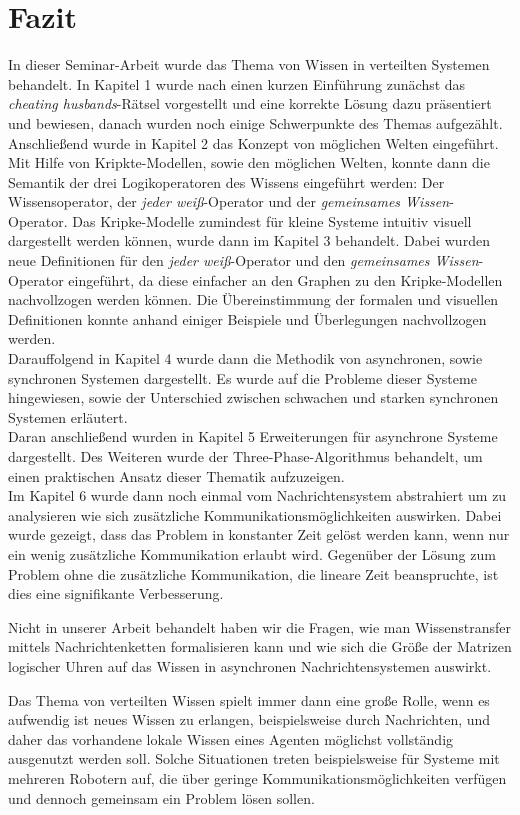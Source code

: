 \section{Fazit}
\label{Zusammenfassung}
In dieser Seminar-Arbeit wurde das Thema von Wissen in verteilten Systemen behandelt.
In Kapitel 1 wurde nach einen kurzen Einführung zunächst das \textit{cheating husbands}-Rätsel vorgestellt und eine korrekte Lösung dazu präsentiert und bewiesen, danach wurden noch einige Schwerpunkte des Themas aufgezählt.
Anschließend wurde in Kapitel 2 das Konzept von möglichen Welten eingeführt. Mit Hilfe von Kripkte-Modellen, sowie den möglichen Welten, konnte dann die Semantik der drei Logikoperatoren des Wissens eingeführt werden: Der Wissensoperator, der \textit{jeder weiß}-Operator und der \textit{gemeinsames Wissen}-Operator.
Das Kripke-Modelle zumindest für kleine Systeme intuitiv visuell dargestellt werden können, wurde dann im Kapitel 3 behandelt. Dabei wurden neue Definitionen für den \textit{jeder weiß}-Operator und den \textit{gemeinsames Wissen}-Operator eingeführt, da diese einfacher an den Graphen zu den Kripke-Modellen nachvollzogen werden können. Die Übereinstimmung der formalen und visuellen Definitionen konnte anhand einiger Beispiele und Überlegungen nachvollzogen werden.\\
Darauffolgend in Kapitel 4 wurde dann die Methodik von asynchronen, sowie synchronen Systemen dargestellt. Es wurde auf die Probleme dieser Systeme hingewiesen, sowie der Unterschied zwischen schwachen und starken synchronen Systemen erläutert.\\
Daran anschließend wurden in Kapitel 5 Erweiterungen für asynchrone Systeme dargestellt. Des Weiteren wurde der Three-Phase-Algorithmus behandelt, um einen praktischen Ansatz dieser Thematik aufzuzeigen. \\
Im Kapitel 6 wurde dann noch einmal vom Nachrichtensystem abstrahiert um zu analysieren wie sich zusätzliche Kommunikationsmöglichkeiten auswirken.
Dabei wurde gezeigt, dass das Problem in konstanter Zeit gelöst werden kann, wenn nur ein wenig zusätzliche Kommunikation erlaubt wird. Gegenüber der Lösung zum Problem ohne die zusätzliche Kommunikation, die lineare Zeit beanspruchte, ist dies eine signifikante Verbesserung.\medskip

Nicht in unserer Arbeit behandelt haben wir die Fragen, wie man Wissenstransfer mittels Nachrichtenketten formalisieren kann und wie sich die Größe der Matrizen logischer Uhren auf das Wissen in asynchronen Nachrichtensystemen auswirkt.\medskip

Das Thema von verteilten Wissen spielt immer dann eine große Rolle, wenn es aufwendig ist neues Wissen zu erlangen, beispielsweise durch Nachrichten, und daher das vorhandene lokale Wissen eines Agenten möglichst vollständig ausgenutzt werden soll.
Solche Situationen treten beispielsweise für Systeme mit mehreren Robotern auf, die über geringe Kommunikationsmöglichkeiten verfügen und dennoch gemeinsam ein Problem lösen sollen.